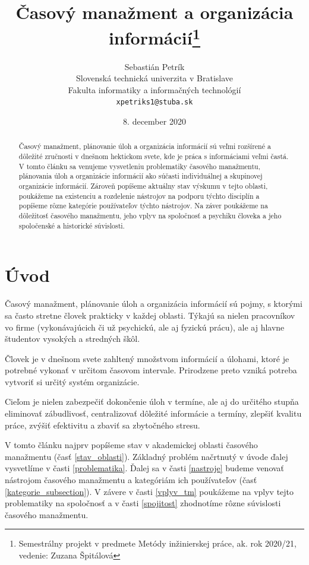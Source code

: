 \documentclass[10pt,slovak,a4paper]{article}
\title{Časový manažment a organizácia informácií\thanks{Semestrálny projekt v predmete Metódy inžinierskej práce, ak. rok 2020/21, vedenie: Zuzana Špitálová}}
\author{Sebastián Petrík\\[2pt]
	{\small Slovenská technická univerzita v Bratislave}\\
	{\small Fakulta informatiky a informačných technológií}\\
	{\small \texttt{xpetriks1@stuba.sk}}
	}
\date{\small 8. december 2020}
\begin{document}
\maketitle

\begin{abstract}
	
	Časový manažment, plánovanie úloh a organizácia informácií sú veľmi rozšírené a dôležité zručnosti v dnešnom hektickom svete, kde je práca s informáciami veľmi častá. V tomto článku sa venujeme vysvetleniu problematiky časového manažmentu, plánovania úloh a organizácie informácií ako súčasti individuálnej a skupinovej organizácie informácií. Zároveň popíšeme aktuálny stav výskumu v tejto oblasti, poukážeme na existenciu a rozdelenie nástrojov na podporu týchto disciplín a popíšeme rôzne kategórie používateľov týchto nástrojov. Na záver poukážeme na dôležitosť časového manažmentu, jeho vplyv na spoločnosť a psychiku človeka a jeho spoločenské a historické súvislosti.

\end{abstract}
\newpage

\section{Úvod} \label{uvod}

	Časový manažment, plánovanie úloh a organizácia informácií sú pojmy, s ktorými sa často stretne človek prakticky v každej oblasti. Týkajú sa nielen pracovníkov vo firme (vykonávajúcich či už psychickú, ale aj fyzickú prácu), ale aj hlavne študentov vysokých a stredných škôl.
	
	Človek je v dnešnom svete zahltený množstvom informácií a úlohami, ktoré je potrebné vykonať v určitom časovom intervale. Prirodzene preto vzniká potreba vytvoriť si určitý systém organizácie.
	
	Cieľom je nielen zabezpečiť dokončenie úloh v termíne, ale aj do určitého stupňa eliminovať zábudlivosť, centralizovať dôležité informácie a termíny, zlepšiť kvalitu práce, zvýšiť efektivitu a zbaviť sa zbytočného stresu.
	
	V tomto článku najprv popíšeme stav v akademickej oblasti časového manažmentu (časť \ref{stav_oblasti}). Základný problém načrtnutý v úvode ďalej vysvetlíme v časti \ref{problematika}. Ďalej sa v časti \ref{nastroje} budeme venovať nástrojom časového manažmentu a kategóriám ich používateľov (časť \ref{kategorie_subsection}). V závere v časti \ref{vplyv_tm} poukážeme na vplyv tejto problematiky na spoločnosť a v časti \ref{spojitost} zhodnotíme rôzne súvislosti časového manažmentu.
	
\end{document}
